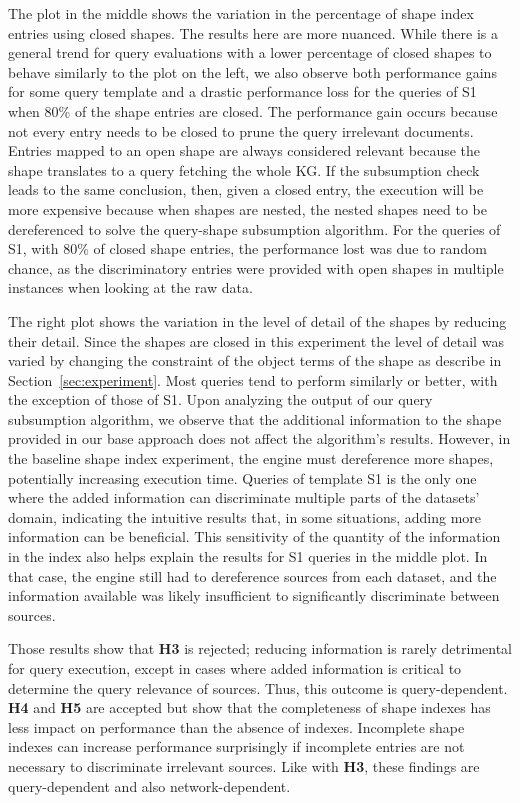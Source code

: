 The plot in the middle shows the variation in the percentage of shape index entries using closed shapes.
The results here are more nuanced.
While there is a general trend for query evaluations with a lower percentage of closed shapes to behave similarly to the plot on the left, we also observe both performance gains for some query template and a drastic performance loss for the queries of S1 when 80\% of the shape entries are closed.
The performance gain occurs because not every entry needs to be closed to prune the query irrelevant documents.
Entries mapped to an open shape are always considered relevant because the shape translates to a query fetching the whole KG.
If the subsumption check leads to the same conclusion, then, given a closed entry, the execution will be more expensive because 
when shapes are nested, the nested shapes need to be dereferenced to solve the query-shape subsumption algorithm.
For the queries of S1, with 80\% of closed shape entries, the performance lost was due to random chance, as the discriminatory entries were provided with open shapes in multiple instances when looking at the raw data.

The right plot shows the variation in the level of detail of the shapes by reducing their detail.
Since the shapes are closed in this experiment the level of detail was varied by changing the constraint of the object terms of the shape as describe in Section~\ref{sec:experiment}.
Most queries tend to perform similarly or better, with the exception of those of S1.
Upon analyzing the output of our query subsumption algorithm, we observe that the additional information to the shape provided in our base approach does not affect the algorithm’s results.
However, in the baseline shape index experiment, the engine must dereference more shapes, potentially increasing execution time.
Queries of template S1 is the only one where the added information can discriminate multiple parts of the datasets' domain, indicating the intuitive results that, in some situations, adding more information can be beneficial.
This sensitivity of the quantity of the information in the index also helps explain the results for S1 queries in the middle plot. 
In that case, the engine still had to dereference sources from each dataset, and the information available was likely insufficient to significantly discriminate between sources.

 

Those results show that \textbf{H3} is rejected; reducing information is rarely detrimental for query execution, except in cases where added information is critical to determine the query relevance of sources.
Thus, this outcome is query-dependent.
\textbf{H4} and \textbf{H5} are accepted but show that the completeness of shape indexes has less impact on performance than the absence of indexes.
Incomplete shape indexes can increase performance surprisingly if incomplete entries are not necessary to discriminate irrelevant sources. 
Like with \textbf{H3}, these findings are query-dependent and also network-dependent.

